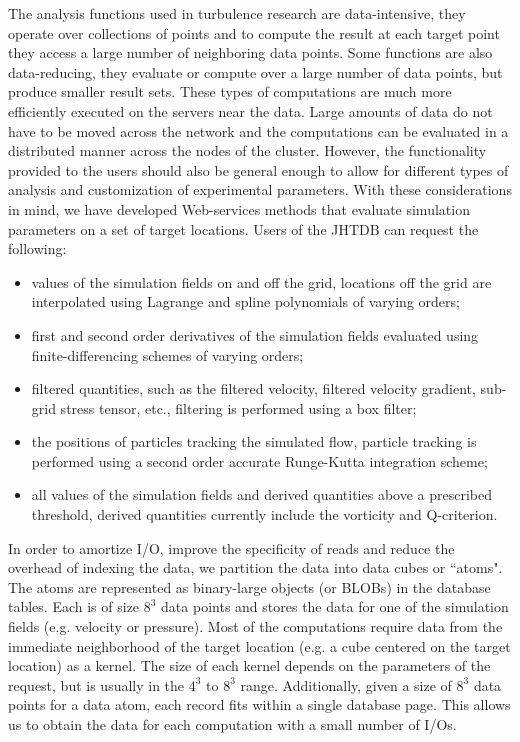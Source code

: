 \documentclass[10pt,twocolumn]{article}
\begin{document}
The analysis functions used in turbulence research are data-intensive, they operate over collections of points and to compute the result at each target point
they access a large number of neighboring data points. Some functions are also data-reducing, they evaluate or compute over a large number of data
points, but produce smaller result sets. These types of computations are much more efficiently executed on the servers near the data. Large amounts of data
do not have to be moved across the network and the computations can be evaluated in a distributed manner across the nodes of the cluster. However, the
functionality provided to the users should also be general enough to allow for different types of analysis and customization of experimental parameters.
With these considerations in mind, we have developed Web-services methods that evaluate simulation parameters on a set of target locations. Users of 
the JHTDB can request the following:
\begin{itemize}
\item values of the simulation fields on and off the grid, locations off the grid are interpolated using Lagrange and spline polynomials of varying orders;
\item first and second order derivatives of the simulation fields evaluated using finite-differencing schemes of varying orders;
\item filtered quantities, such as the filtered velocity, filtered velocity gradient, sub-grid stress tensor, etc., filtering is performed using a box filter;
\item the positions of particles tracking the simulated flow, particle tracking is performed using a second order accurate Runge-Kutta integration scheme;
\item all values of the simulation fields and derived quantities above a prescribed threshold, derived quantities currently include the vorticity and Q-criterion.
\end{itemize}

In order to amortize I/O, improve the specificity of reads and reduce the overhead of indexing the data, we partition the data into data cubes or ``atoms".
The atoms are represented as binary-large objects (or BLOBs) in the database tables. Each is of size $8^3$ data points and stores the data for one of the
simulation fields (e.g. velocity or pressure). Most of the computations require data from the immediate neighborhood of the target location (e.g. a cube
centered on the target location) as a kernel. The size of each kernel depends on the parameters of the request, but is usually in the $4^3$ to $8^3$ range.
Additionally, given a size of $8^3$ data points for a data atom, each record fits within a single database page. This allows us to obtain the data for each
computation with a small number of I/Os.
\end{document}
